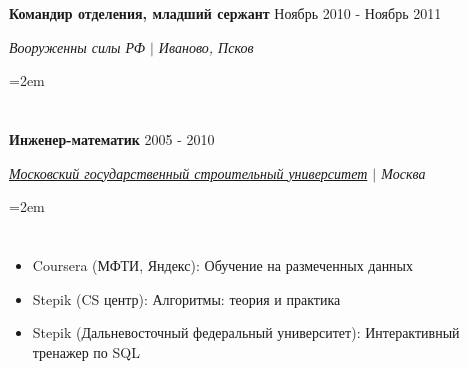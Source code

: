 \documentclass{article}
\newcommand{\NewPart}[1]{\section*{{\color{gray}{#1}}}}
\newcommand{\ExperienceEntry}[4]{
		\noindent \textbf{#1} \hfill  
		\hfill #2 \par  %
		\noindent \textit{#3} \par        %
		\noindent\hangindent=2em\hangafter=0 \small #4 %
		\normalsize \par}
\begin{document}
\ExperienceEntry
{Командир отделения, младший сержант}
{Ноябрь 2010 - Ноябрь 2011}
{Вооруженны силы РФ $\vert$ Иваново, Псков}
{	

}


\NewPart{Образование}{}

\ExperienceEntry
{Инженер-математик}
{2005 - 2010}
{\href{https://mgsu.ru/}
{Московский государственный строительный университет} $\vert$ Москва}
{}

\NewPart{Курсы }{}
{	
\begin{itemize}
	\item{Coursera (МФТИ, Яндекс): Обучение на размеченных данных}
	\item{Stepik (CS центр): Алгоритмы: теория и практика}
	\item{Stepik (Дальневосточный федеральный университет): Интерактивный тренажер по SQL}
        
\end{itemize}
}
\end{document}
